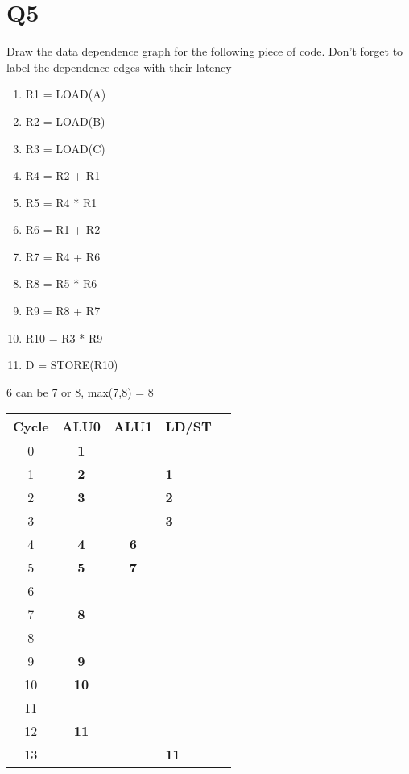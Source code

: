 \documentclass{report}
\begin{document}
\section{Q5}
Draw the data dependence graph for the following piece of code. Don't forget to label the dependence edges with their latency
\vspace{-1em}
\begin{multicols}{2}
\begin{enumerate}
  \item R1 = LOAD(A)
  \item R2 = LOAD(B)
  \item R3 = LOAD(C)
  \item R4 = R2 + R1
  \item R5 = R4 * R1
  \item R6 = R1 + R2
  \item R7 = R4 + R6
  \item R8 = R5 * R6
  \item R9 = R8 + R7
  \item R10 = R3 * R9
  \item D = STORE(R10)
\end{enumerate}
6 can be 7 or 8, max(7,8) = 8 \\
  \begin{tabular}{|c|>{\bfseries}c|>{\bfseries}c|>{\bfseries}l|>{\bfseries}l|}
    \hline
  	Cycle & ALU0   & ALU1 & LD/ST \\
    \hline
     0 &  1 &   &    \\
    \hline
     1 &  2 &   & 1  \\
    \hline
     2 &  3 &   & 2  \\
    \hline
     3 &    &   & 3  \\
    \hline
     4 &  4 & 6 &    \\
    \hline
     5 &  5 & 7 &    \\
    \hline
     6 &    &   &    \\
    \hline
     7 &  8 &   &    \\
    \hline
     8 &    &   &    \\
    \hline
     9 &  9 &   &    \\
    \hline
    10 & 10 &   &    \\
    \hline
    11 &    &   &    \\
    \hline
    12 & 11 &   &    \\
    \hline
    13 &    &   & 11 \\
    \hline
  \end{tabular}
  \vfill\columnbreak

\end{multicols}
\end{document}
